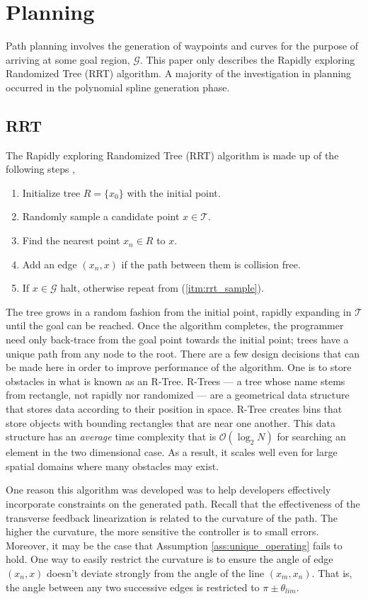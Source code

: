 \documentclass[oneside, 11pt]{book}
\begin{document}
\chapter{Planning}\label{sec:planning}
Path planning involves the generation of waypoints and curves for the purpose of arriving at some goal region, $\mathcal{G}$. This paper only describes the Rapidly exploring Randomized Tree (RRT) algorithm. A majority of the investigation in planning occurred in the polynomial spline generation phase.

\section{RRT}
The Rapidly exploring Randomized Tree (RRT) algorithm is made up of the following steps \cite{Karaman11},
\begin{enumerate}
    \item Initialize tree $R=\{ x_0 \}$ with the initial point.
    \item Randomly sample a candidate point $x \in \mathcal{T}$.\label{itm:rrt_sample}
    \item Find the nearest point $x_n\in R$ to $x$.
    \item Add an edge $(x_n, x)$ if the path between them is collision free.
    \item If $x\in\mathcal{G}$ halt, otherwise repeat from (\ref{itm:rrt_sample}).
\end{enumerate}
The tree grows in a random fashion from the initial point, rapidly expanding in $\mathcal{T}$ until the goal can be reached. Once the algorithm completes, the programmer need only back-trace from the goal point towards the initial point; trees have a unique path from any node to the root. There are a few design decisions that can be made here in order to improve performance of the algorithm. One is to store obstacles in what is known as an R-Tree. R-Trees --- a tree whose name stems from rectangle, not rapidly nor randomized --- are a geometrical data structure that stores data according to their position in space. R-Tree creates bins that store objects with  bounding rectangles that are near one another. This data structure has an \emph{average} time complexity that is $\mathcal{O}(\log_2 N)$ for searching an element in the two dimensional case. As a result, it scales well even for large spatial domains where many obstacles may exist.

One reason this algorithm was developed was to help developers effectively incorporate constraints on the generated path. Recall that the effectiveness of the transverse feedback linearization is related to the curvature of the path. The higher the curvature, the more sensitive the controller is to small errors. Moreover, it may be the case that Assumption \ref{ass:unique_operating} fails to hold. One way to easily restrict the curvature is to ensure the angle of edge $(x_n, x)$ doesn't deviate strongly from the angle of the line $(x_m, x_n)$. That is, the angle between any two successive edges is restricted to $\pi\pm\theta_{lim}$.
\end{document}
